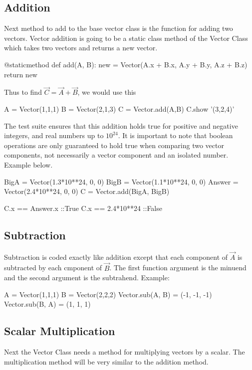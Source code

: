 \documentclass[15pt]{report}
\begin{document}
\subsection{Addition} Next method to add to the base vector class is the function for adding two vectors. Vector addition is going to be a static class method of the Vector Class which takes two vectors and returns a new vector.

\begin{code} 
    @staticmethod
    def add(A, B):
        new = Vector(A.x + B.x, 
                     A.y + B.y,
                     A.z + B.z)
        return new
\end{code}

Thus to find $\vec{C} =\vec{A} + \vec{B}$, we would use this

\begin{code}
A = Vector(1,1,1)
B = Vector(2,1,3)
C = Vector.add(A,B)
C.show
'(3,2,4)'
\end{code} 

The test suite ensures that this addition holds true for positive and negative integers, and real numbers up to $10^{24}$. It is important to note that boolean operations are only guaranteed to hold true when comparing two vector components, not necessarily a vector component and an isolated number. Example below.

\begin{code}
BigA = Vector(1.3*10**24, 0, 0)
BigB = Vector(1.1*10**24, 0, 0)
Answer = Vector(2.4*10**24, 0, 0)
C = Vector.add(BigA, BigB)

C.x == Answer.x        ::True
C.x == 2.4*10**24      ::False
\end{code} 

\subsection{Subtraction}Subtraction is coded exactly like addition except that each component of $\vec{A}$ is subtracted by each cmponent of $\vec{B}$. The first function argument is the minuend and the second argument is the subtrahend. Example:

\begin{code}
A = Vector(1,1,1)
B = Vector(2,2,2)
Vector.sub(A, B) = (-1, -1, -1)
Vector.sub(B, A) = (1, 1, 1)
\end{code}

\subsection{Scalar Multiplication} Next the Vector Class needs a method for multiplying vectors by a scalar. The multiplication method will be very similar to the addition method.
\end{document}
